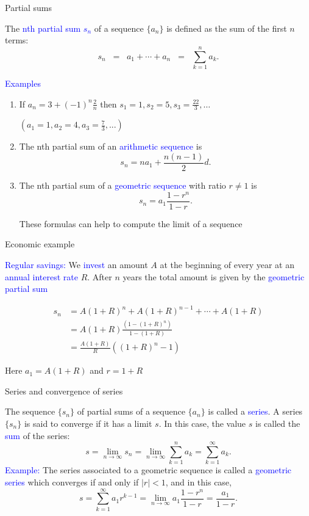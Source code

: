\documentclass[11pt,aspectratio=169]{beamer}
\begin{document}
\begin{frame}{Partial sums}

The \textcolor{blue}{nth partial sum $s_n$} of a sequence $\{a_n\}$ is defined as the sum of the first $n$ terms:
$$
s_n\;\;=\;\;a_1+\cdots+a_n\;\;=\;\;\sum_{k=1}^n a_k.
$$

\textcolor{blue}{Examples} 
\begin{enumerate}
\item If $a_n=3+(-1)^n \frac{2}{n}$ then
$
s_1=1, s_2=5, s_3=\frac{22}{3},\dots
$

\begin{tiny}$(a_1=1, a_2=4,a_3=\frac73,...)$ \end{tiny}

\item The nth partial sum of an \textcolor{blue}{arithmetic sequence} is $$s_n=n a_1+\frac{n(n-1)}{2}d.$$



\item The nth partial sum of a \textcolor{blue}{geometric sequence} with ratio $r \neq 1$ is $$s_n=a_1 \frac{1-r^n}{1-r}.$$
\begin{tiny}These formulas can help to compute the limit of a sequence\end{tiny}
\end{enumerate}\end{frame}

\begin{frame}{Economic example }

\textcolor{blue}{Regular savings:} We \textcolor{blue}{invest} an amount $A$ at the beginning of every year at an \textcolor{blue}{annual interest rate} $R$. After $n$ years the total amount is given by the \textcolor{blue}{geometric partial sum} 

\begin{align*}
s_n&=A(1+R)^n+A(1+R)^{n-1}+\cdots+A(1+R)\\
&= A(1+R)\frac{(1-(1+R)^n)}{1-(1+R)}\\
&=\frac{A(1+R)}{R}((1+R)^n-1)
\end{align*}
\begin{tiny} Here $a_1=A(1+R)$ and $r=1+R$\end{tiny}\end{frame}

\begin{frame}{Series and convergence of series}

The sequence $\{s_n\}$ of partial sums of a sequence $\{a_n\}$ is called a \textcolor{blue}{series}. 
\vskip 12pt
A series $\{ s_n\}$ is said to converge if it has a limit $s$. In this case, the value $s$ is called the \textcolor{blue}{sum} of the series:
$$
s=\lim_{n \rightarrow \infty} s_n=\lim_{n \rightarrow \infty} \sum_{k=1}^n a_k
=\sum_{k=1}^{\infty} a_k.
$$
\vskip 12pt
\textcolor{blue}{Example:} The series associated to a  geometric sequence is called a \textcolor{blue}{geometric series} which converges if and only if $\vert r \vert <1$, and in this case,
$$
s=\sum_{k=1}^{\infty} a_1 r^{k-1}=\lim_{n \rightarrow \infty}
a_1 \frac{1-r^n}{1-r}=\frac{a_1}{1-r}. 
$$\end{frame}
\end{document}
